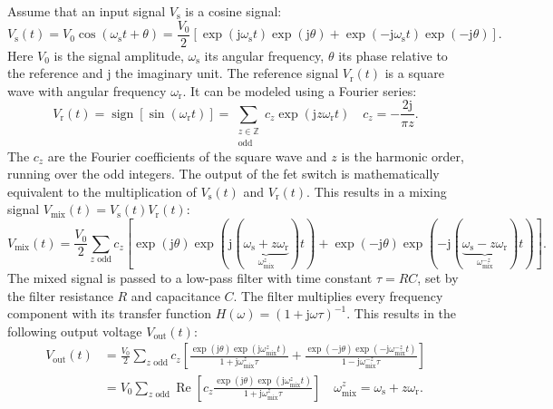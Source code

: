 Assume that an input signal $V_{\mathrm{s}}$ is a cosine signal:
\begin{equation}
	V_{\mathrm{s}}(t)=V_{0}\cos(\omega_{\mathrm{s}}t+\theta) = \frac{V_{0}}{2}[\exp
	(\mathrm{j}\omega_{\mathrm{s}}t)\exp(\mathrm{j}\theta)+\exp(-\mathrm{j}\omega_{\mathrm{s}}
	t) \exp(-\mathrm{j}\theta)]. \label{eq:lock_in_signal}
\end{equation}
Here $V_{0}$ is the signal amplitude, $\omega_{\mathrm{s}}$ its angular
frequency, $\theta$ its phase relative to the reference and $\mathrm{j}$ the imaginary
unit. The reference signal $V_{\mathrm{r}}(t)$ is a square wave with angular
frequency $\omega_{\mathrm{r}}$. It can be modeled using a Fourier series:
\begin{equation}
	V_{\mathrm{r}}(t) = \operatorname{sign}[\sin(\omega_{\mathrm{r}}t)] = \sum_{\substack{z \in \mathbb{Z} \\ \text{odd}}}
	c_{z}\exp(\mathrm{j}z \omega_{\mathrm{r}}t) \quad c_{z}=-\frac{2\mathrm{j}}{\pi
	z}. \label{eq:lock_in_reference}
\end{equation}
The $c_{z}$ are the Fourier coefficients of the square wave and $z$ is the
harmonic order, running over the odd integers. The output of the \ac{fet} switch is
mathematically equivalent to the multiplication of $V_{\mathrm{s}}(t)$ and $V_{\mathrm{r}}
(t)$. This results in a mixing signal
$V_{\mathrm{mix}}(t)=V_{\mathrm{s}}(t)V_{\mathrm{r}}(t)$:
\begin{equation}
	V_{\mathrm{mix}}(t)=\frac{V_{0}}{2}\sum_{z \text{ odd}}c_{z}[ \exp(\mathrm{j}\theta
	)\exp(\mathrm{j}(\underbrace{ \omega_{\mathrm{s}}+z \omega_{\mathrm{r}} }_{ \omega_{\mathrm{mix}}^{z}
	})t) +\exp(-\mathrm{j}\theta) \exp(-\mathrm{j}(\underbrace{ \omega_{\mathrm{s}}-z
	\omega_{\mathrm{r}} }_{ \omega_{\mathrm{mix}}^{-z} })t) ]. \label{eq:lock_in_mixing}
\end{equation}
The mixed signal is passed to a low-pass filter with time constant $\tau=RC$,
set by the filter resistance $R$ and capacitance $C$. The filter multiplies every
frequency component with its transfer function $H(\omega) = (1+\mathrm{j}\omega \tau
)^{-1}$. This results in the following output voltage $V_{\mathrm{out}}(t)$:
\begin{align}
	V_{\mathrm{out}}(t) & =\frac{V_{0}}{2}\sum_{z \text{ odd}}c_{z}\left[ \frac{\exp(\mathrm{j}\theta)\exp(\mathrm{j}\omega_{\mathrm{mix}}^{z}t)}{1 + \mathrm{j}\omega_{\mathrm{mix}}^{z}\tau}+\frac{\exp(-\mathrm{j}\theta) \exp(-\mathrm{j}\omega_{\mathrm{mix}}^{-z}t)}{1 - \mathrm{j}\omega_{\mathrm{mix}}^{-z}\tau}\right] \\
	                    & =V_{0}\sum_{z \text{ odd}}\operatorname{Re}\left[ c_{z}\frac{\exp(\mathrm{j}\theta)\exp(\mathrm{j}\omega_{\mathrm{mix}}^{z}t)}{1 + \mathrm{j}\omega_{\mathrm{mix}}^{z}\tau}\right] \quad \omega_{\mathrm{mix}}^{z}=\omega_{\mathrm{s}}+z \omega_{\mathrm{r}}. \label{eq:lock_in_output}
\end{align}
